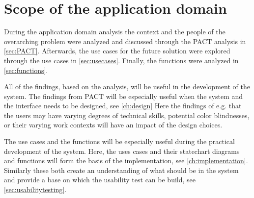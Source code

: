 \section{Scope of the application domain}

During the application domain analysis the context and the people of the overarching problem were analyzed and discussed through the PACT analysis in \cref{sec:PACT}.
Afterwards, the use cases for the future solution were explored through the use cases in \cref{sec:usecases}.
Finally, the functions were analyzed in \cref{sec:functions}.

All of the findings, based on the analysis, will be useful in the development of the system.
The findings from PACT will be especially useful when the system and the interface needs to be designed, see \cref{ch:design}
Here the findings of e.g. that the users may have varying degrees of technical skills, potential color blindnesses, or their varying work contexts will have an impact of the design choices.

The use cases and the functions will be especially useful during the practical development of the system.
Here, the uses cases and their statechart diagrams and functions will form the basis of the implementation, see \cref{ch:implementation}.
Similarly these both create an understanding of what should be in the system and provide a base on which the usability test can be build, see \cref{sec:usabilitytesting}.
